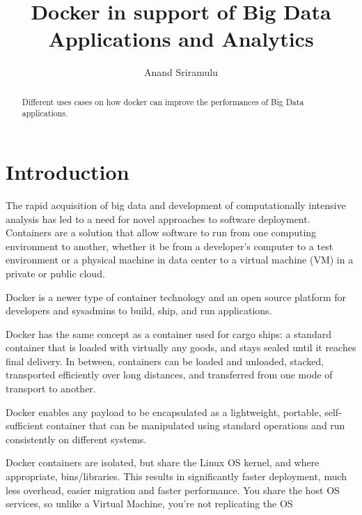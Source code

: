 \documentclass[sigconf]{acmart}
\begin{document}
	\title {Docker in support of Big Data Applications and Analytics}
	
	
	\author{Anand Sriramulu}
	
	
	\renewcommand{\shortauthors}{Anand S}
	
	
	\begin{abstract}
		Different uses cases on how docker can improve the performances of Big Data applications.
	\end{abstract}
	
	
	\maketitle
	
	\section{Introduction}
	The rapid acquisition of big data and development of computationally intensive analysis has led to a need for novel approaches to software deployment. Containers are a solution that allow software to run from one computing environment to another, whether it be from a developer's computer to a test environment or a physical machine in data center to a virtual machine (VM) in a private or public cloud.  
	
	Docker is a newer type of container technology and an open source platform for developers and sysadmins to build, ship, and run applications.
	
	Docker has the same concept as a container used for cargo ships: a standard container that is loaded with virtually any goods, and stays sealed until it reaches final delivery. In between, containers can be loaded and unloaded, stacked, transported efficiently over long distances, and transferred from one mode of transport to another. \cite{About_Docker}
	
	Docker enables any payload to be encapsulated as a lightweight, portable, self-sufficient container that can be manipulated using standard operations and run consistently on different systems.
	
	Docker containers are isolated, but share the Linux OS kernel, and where appropriate, bins/libraries. This results in significantly faster deployment, much less overhead, easier migration and faster performance. You share the host OS services, so unlike a Virtual Machine, you're not replicating the OS
	
\end{document}
